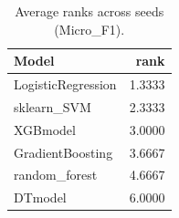 \begin{table}[t]
\centering
\begin{tabular}{lr}
\toprule
Model & rank \\
\midrule
LogisticRegression & 1.3333 \\
sklearn_SVM & 2.3333 \\
XGBmodel & 3.0000 \\
GradientBoosting & 3.6667 \\
random_forest & 4.6667 \\
DTmodel & 6.0000 \\
\bottomrule
\end{tabular}
\caption{Average ranks across seeds (Micro_F1).}
\label{tab:avg_rank_Micro_F1}
\end{table}